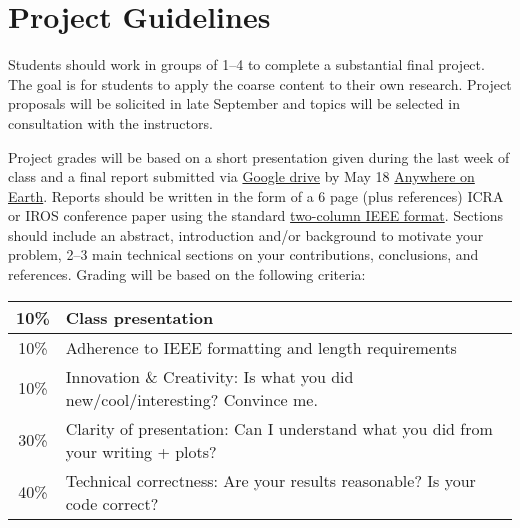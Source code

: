 \documentclass[11pt,letterpaper]{article}
\begin{document}
\section*{Project Guidelines}

Students should work in groups of 1--4 to complete a substantial final project. The goal is for students to apply the coarse content to their own research. Project proposals will be solicited in late September and topics will be selected in consultation with the instructors.

\medskip
\noindent
Project grades will be based on a short presentation given during the last week of class and a final report submitted via \href{https://forms.gle/j1xhW13DuvcYLf6j7}{Google drive} by May 18 \href{https://time.is/Anywhere_on_Earth}{Anywhere on Earth}. Reports should be written in the form of a 6 page (plus references) ICRA or IROS conference paper using the standard \href{https://www.ieee.org/conferences/publishing/templates.html}{two-column IEEE format}. Sections should include an abstract, introduction and/or background to motivate your problem, 2--3 main technical sections on your contributions, conclusions, and references. Grading will be based on the following criteria:
\newline
\newline
\begin{tabular}{|c|l|}
\hline
10\% & Class presentation \\
\hline
10\% & Adherence to IEEE formatting and length requirements \\
\hline
10\% & Innovation \& Creativity: Is what you did new/cool/interesting? Convince me. \\
\hline
30\% & Clarity of presentation: Can I understand what you did from your writing + plots? \\
\hline
40\% & Technical correctness: Are your results reasonable? Is your code correct? \\
\hline	
\end{tabular}
\end{document}
